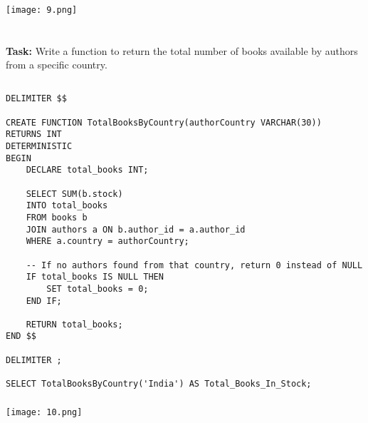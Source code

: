 \documentclass[12pt,a4paper]{article}
\begin{document}
\subsubsection{}
\begin{center}
    \texttt{[image: 9.png]}
\end{center}


\section{}
\textbf{Task:} Write a function to return the total number of books available by authors from a specific country.

\subsection{}
\begin{lstlisting}
DELIMITER $$

CREATE FUNCTION TotalBooksByCountry(authorCountry VARCHAR(30))
RETURNS INT
DETERMINISTIC
BEGIN
    DECLARE total_books INT;

    SELECT SUM(b.stock) 
    INTO total_books
    FROM books b
    JOIN authors a ON b.author_id = a.author_id
    WHERE a.country = authorCountry;

    -- If no authors found from that country, return 0 instead of NULL
    IF total_books IS NULL THEN
        SET total_books = 0;
    END IF;

    RETURN total_books;
END $$

DELIMITER ;

SELECT TotalBooksByCountry('India') AS Total_Books_In_Stock;
\end{lstlisting}

\subsubsection{}
\begin{center}
    \texttt{[image: 10.png]}
\end{center}
\end{document}
